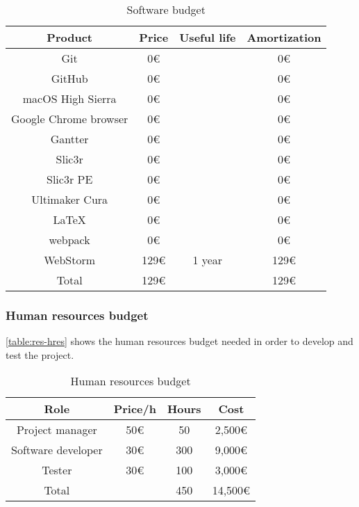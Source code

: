 \FloatBarrier
\begin{table}[h!]
\centering
\begin{tabular}{ |c|c|c|c| } 
    \hline
    Product & Price & Useful life & Amortization \\
    \hline
    \hline
    Git & 0€ & & 0€ \\ 
    \hline
    GitHub & 0€ & & 0€ \\ 
    \hline
    macOS High Sierra & 0€ & & 0€ \\ 
    \hline
    Google Chrome browser & 0€ & & 0€ \\ 
    \hline
    Gantter & 0€ & & 0€ \\ 
    \hline
    Slic3r & 0€ & & 0€ \\ 
    \hline
    Slic3r PE & 0€ & & 0€ \\ 
    \hline
    Ultimaker Cura & 0€ & & 0€ \\ 
    \hline
    \LaTeX & 0€ & & 0€ \\ 
    \hline
    webpack & 0€ & & 0€ \\ 
    \hline
    WebStorm & 129€ & 1 year & 129€ \\ 
    \hline
    \hline
    Total & 129€ & & 129€ \\
    \hline
\end{tabular}
\caption{Software budget}\label{table:res-sw}
\end{table}
\FloatBarrier

\subsubsection{Human resources budget}

\autoref{table:res-hres}
shows the human resources budget needed in order to develop and test the project.

\FloatBarrier
\begin{table}[h!]
\centering
\begin{tabular}{ |c|c|c|c| } 
    \hline
    Role & Price/h & Hours & Cost \\
    \hline
    \hline
    Project manager & 50€ & 50 & 2,500€ \\
    \hline
    Software developer & 30€ & 300 & 9,000€ \\
    \hline
    Tester & 30€ & 100 & 3,000€ \\
    \hline
    \hline
    Total & & 450 & 14,500€ \\
    \hline
\end{tabular}
\caption{Human resources budget \cite{dev-salary, pm-salary, qa-eng-salary}}\label{table:res-hres}
\end{table}
\FloatBarrier

